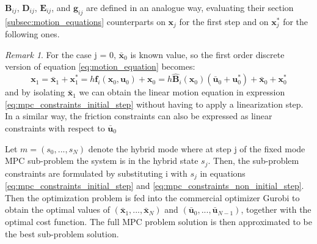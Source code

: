 \documentclass[12,twoside]{TFG-GM}
\theoremstyle{definition}
\theoremstyle{remark}
\newtheorem{remark}[theorem]{Remark}
\newcommand*\diff[1]{\bar{#1}}
\begin{document}
$\textbf{B}_{ij}$, $\textbf{D}_{ij}$, $\textbf{E}_{ij}$, and $\textbf{g}_{ij}$ are defined in an analogue way, evaluating their section \ref{subsec:motion_equations} counterparts on $\textbf{x}_j$ for the first step and on $\textbf{x}_j^*$ for the following ones.

\begin{remark}
For the case j = 0, $\diff{\textbf{x}}_0$ is known value, so the first order discrete version of equation \ref{eq:motion_equation} becomes:
\begin{equation}
\textbf{x}_1 = \diff{\textbf{x}}_1 + \textbf{x}_1^* = h \textbf{f}_i(\textbf{x}_0, \textbf{u}_0) + \textbf{x}_0 = h \hat{\textbf{B}}_i(\textbf{x}_0)  (\diff{\textbf{u}}_0 + \textbf{u}_0^*) + \diff{\textbf{x}}_0 + \textbf{x}_0^* 
\end{equation}
and by isolating $\diff{\textbf{x}}_1$ we can obtain the linear motion equation in expression \ref{eq:mpc_constraints_initial_step} without having to apply a linearization step. In a similar way, the friction constraints can also be expressed as linear constraints with respect to $\diff{\textbf{u}}_0$ 
\end{remark}

Let $m = (s_0, ..., s_N)$ denote the hybrid mode where at step j of the fixed mode MPC sub-problem the system is in the hybrid state $s_j$. Then, the sub-problem constraints are formulated by substituting i with $s_j$ in equations \ref{eq:mpc_constraints_initial_step} and \ref{eq:mpc_constraints_non_initial_step}. Then the optimization problem is fed into the commercial optimizer Gurobi \cite{gurobi} to obtain the optimal values of $(\diff{\textbf{x}}_1, ..., \diff{\textbf{x}}_N)$ and $(\diff{\textbf{u}}_0, ..., \diff{\textbf{u}}_{N-1})$, together with the optimal cost function. The full MPC problem solution is then approximated to be the best sub-problem solution.
\end{document}
